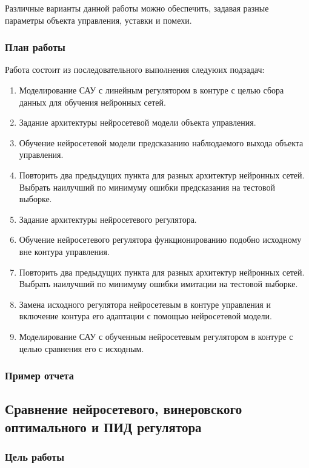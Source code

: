 Различные варианты данной работы можно обеспечить, задавая разные
параметры объекта управления, уставки и помехи.

\subsubsection{План работы}

Работа состоит из последовательного выполнения следуюих подзадач:
\begin{enumerate}
\item Моделирование САУ с линейным регулятором в контуре с целью сбора
  данных для обучения нейронных сетей.
\item Задание архитектуры нейросетевой модели объекта управления.
\item Обучение нейросетевой модели предсказанию наблюдаемого выхода
  объекта управления.
\item Повторить два предыдущих пункта для разных архитектур нейронных
  сетей.  Выбрать наилучший по минимуму ошибки предсказания на
  тестовой выборке.
\item Задание архитектуры нейросетевого регулятора.
\item Обучение нейросетевого регулятора функционированию подобно
  исходному вне контура управления.
\item Повторить два предыдущих пункта для разных архитектур нейронных
  сетей.  Выбрать наилучший по минимуму ошибки имитации на тестовой
  выборке.
\item Замена исходного регулятора нейросетевым в контуре управления и
  включение контура его адаптации с помощью нейросетевой модели.
\item Моделирование САУ с обученным нейросетевым регулятором в контуре
  с целью сравнения его с исходным.
\end{enumerate}

\subsubsection{Пример отчета}


\subsection{Сравнение нейросетевого, винеровского оптимального и ПИД регулятора}

\subsubsection{Цель работы}

